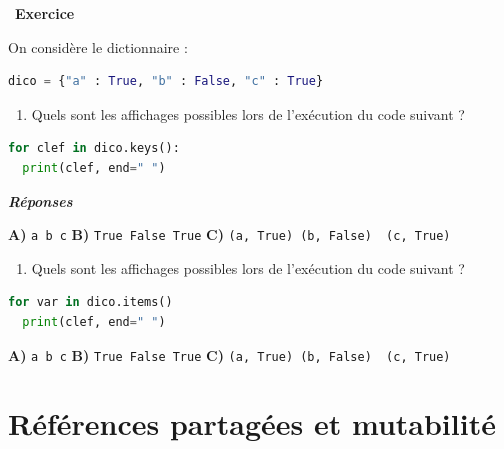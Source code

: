 \documentclass[
  11pt,
]{article}
\newcommand{\passthrough}[1]{#1}
\providecommand{\tightlist}{%
  \setlength{\itemsep}{0pt}\setlength{\parskip}{0pt}}
\newcounter{exo}
\newenvironment{exercice}[1]
{\par \medskip   \addtocounter{exo}{1} \noindent  
\begin{bclogo}[arrondi =0.1,   noborder = true, logo=\bccrayon, marge=4]{~\textbf{Exercice} \textbf{\theexo} {\itshape #1} }  \par}
{
\end{bclogo}
 \par \bigskip }
\newcounter{def}
\begin{document}
\begin{exercice}{}

On considère le dictionnaire :

\begin{lstlisting}[language=Python]
dico = {"a" : True, "b" : False, "c" : True}
\end{lstlisting}

\begin{enumerate}
\def\labelenumi{\arabic{enumi}.}
\tightlist
\item
  Quels sont les affichages possibles lors de l'exécution du code
  suivant ?
\end{enumerate}

\begin{lstlisting}[language=Python]
for clef in dico.keys():
  print(clef, end=" ")
\end{lstlisting}

\textbf{\emph{Réponses}}

\textbf{A)} \passthrough{\lstinline!a b c!} \textbf{B)}
\passthrough{\lstinline!True False True!} \textbf{C)}
\passthrough{\lstinline!(a, True) (b, False)  (c, True)!}

\begin{enumerate}
\def\labelenumi{\arabic{enumi}.}
\setcounter{enumi}{1}
\tightlist
\item
  Quels sont les affichages possibles lors de l'exécution du code
  suivant ?
\end{enumerate}

\begin{lstlisting}[language=Python]
for var in dico.items()
  print(clef, end=" ")
\end{lstlisting}

\textbf{A)} \passthrough{\lstinline!a b c!} \textbf{B)}
\passthrough{\lstinline!True False True!} \textbf{C)}
\passthrough{\lstinline!(a, True) (b, False)  (c, True)!}

\end{exercice}

\hypertarget{ruxe9fuxe9rences-partaguxe9es-et-mutabilituxe9}{%
\section{Références partagées et
mutabilité}\label{ruxe9fuxe9rences-partaguxe9es-et-mutabilituxe9}}
\end{document}
